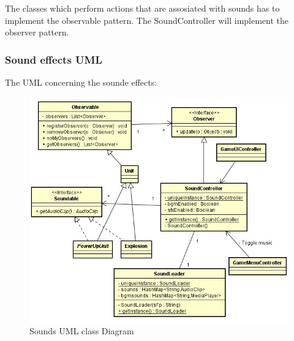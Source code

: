 The classes which perform actions that are assosiated with sounds has to implement the observable pattern.
The SoundController will implement the observer pattern.
\newpage
\subsubsection{ Sound effects UML}
The UML concerning the sounde effects:
\begin{figure}[ht!]
\centering
\includegraphics[width=15cm]{sounds.jpg}
\caption{Sounds UML class Diagram}
\label{fig:1-2sounds}
\end{figure}
